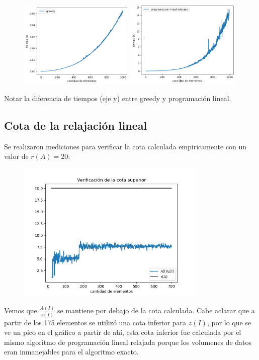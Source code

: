 \begin{figure}[H]
    \centering
    \includegraphics[width=0.49\textwidth]{img/greedy.png}
    \includegraphics[width=0.49\textwidth]{img/pl_rlx.png}
\end{figure}

Notar la diferencia de tiempos (eje y) entre greedy y programación lineal.

\subsection{Cota de la relajaci\'on lineal}

Se realizaron mediciones para verificar la cota calculada empiricamente con un
valor de $r(A) = 20$:

\begin{figure}[H]
    \centering
    \includegraphics[width=0.8\textwidth]{img/cota.png}
\end{figure}

Vemos que $\frac{A(I)}{z(I)}$ se mantiene por debajo de la cota calculada. Cabe
aclarar que a partir de los 175 elementos se utiliz\'o una cota inferior para
$z(I)$, por lo que se ve un pico en el gr\'afico a partir de ah\'i, esta cota
inferior fue calculada por el mismo algoritmo de programaci\'on lineal relajada
porque los volumenes de datos eran inmanejables para el algoritmo exacto.
